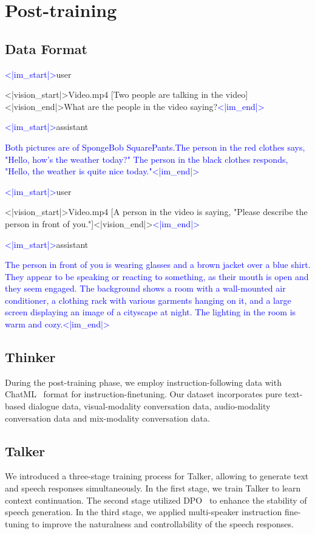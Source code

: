 \section{Post-training}\label{sec:post}
\subsection{Data Format}
\begin{tcolorbox}[colback=black!5!white,colframe=black!75!black,title=The Dataset Format Example of ChatML]
\textcolor{blue}{<|im\_start|>}user

<|vision\_start|>Video.mp4 [Two people are talking in the video]<|vision\_end|>What are the people in the video saying?\textcolor{blue}{<|im\_end|>}

\textcolor{blue}{<|im\_start|>}assistant

\textcolor{blue}{Both pictures are of SpongeBob SquarePants.The person in the red clothes says, "Hello, how's the weather today?" The person in the black clothes responds, "Hello, the weather is quite nice today."<|im\_end|>}

\textcolor{blue}{<|im\_start|>}user

<|vision\_start|>Video.mp4 [A person in the video is saying, "Please describe the person in front of you."]<|vision\_end|>\textcolor{blue}{<|im\_end|>}

\textcolor{blue}{<|im\_start|>}assistant

\textcolor{blue}{The person in front of you is wearing glasses and a brown jacket over a blue shirt. They appear to be speaking or reacting to something, as their mouth is open and they seem engaged. The background shows a room with a wall-mounted air conditioner, a clothing rack with various garments hanging on it, and a large screen displaying an image of a cityscape at night. The lighting in the room is warm and cozy.<|im\_end|>}
\end{tcolorbox}

\subsection{Thinker}
During the post-training phase, we employ instruction-following data with ChatML~\citep{chatml} format for instruction-finetuning. Our dataset incorporates pure text-based dialogue data, visual-modality conversation data, audio-modality conversation data and mix-modality conversation data. 

\subsection{Talker}
We introduced a three-stage training process for Talker, allowing \method to generate text and speech responses simultaneously. In the first stage, we train Talker to learn context continuation. The second stage utilized DPO~\citep{rafailov2024direct} to enhance the stability of speech generation. In the third stage, we applied multi-speaker instruction fine-tuning to improve the naturalness and controllability of the speech responses.

